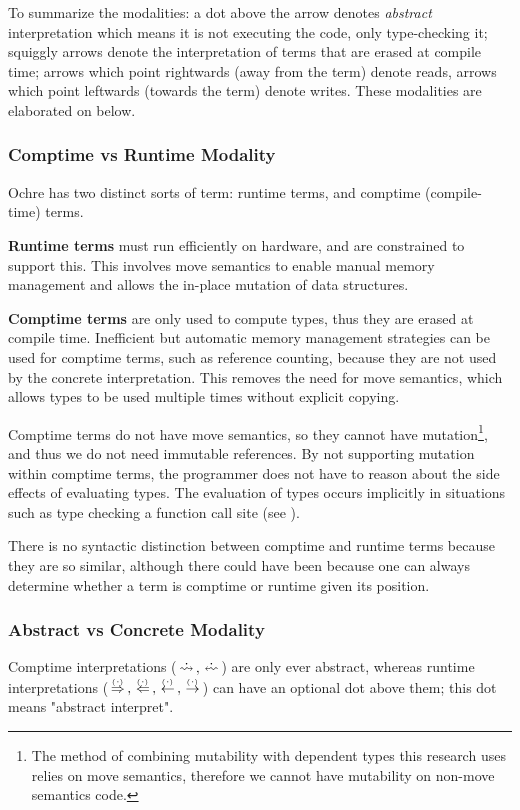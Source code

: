\documentclass[12pt,twoside]{report}
\begin{document}
To summarize the modalities: a dot above the arrow denotes \textit{abstract} interpretation which means it is not executing the code, only type-checking it; squiggly arrows denote the interpretation of terms that are erased at compile time; arrows which point rightwards (away from the term) denote reads, arrows which point leftwards (towards the term) denote writes. These modalities are elaborated on below.

\subsubsection{Comptime vs Runtime Modality}
Ochre has two distinct sorts of term: runtime terms, and comptime (compile-time) terms.

\textbf{Runtime terms} must run efficiently on hardware, and are constrained to support this. This involves move semantics to enable manual memory management and allows the in-place mutation of data structures.

\textbf{Comptime terms} are only used to compute types, thus they are erased at compile time. Inefficient but automatic memory management strategies can be used for comptime terms, such as reference counting, because they are not used by the concrete interpretation. This removes the need for move semantics, which allows types to be used multiple times without explicit copying.

Comptime terms do not have move semantics, so they cannot have mutation\footnote{The method of combining mutability with dependent types this research uses relies on move semantics, therefore we cannot have mutability on non-move semantics code.}, and thus we do not need immutable references. By not supporting mutation within comptime terms, the programmer does not have to reason about the side effects of evaluating types. The evaluation of types occurs implicitly in situations such as type checking a function call site (see ).
 
There is no syntactic distinction between comptime and runtime terms because they are so similar, although there could have been because one can always determine whether a term is comptime or runtime given its position.

\subsubsection{Abstract vs Concrete Modality}
Comptime interpretations ($\erasedreadarrow, \erasedwritearrow$) are only ever abstract, whereas runtime interpretations ($\,\stackrel{_(._)}{\Rightarrow}\,, \,\stackrel{_(._)}{\Leftarrow}\,, \,\stackrel{_(._)}{\leftarrow}\,, \,\stackrel{_(._)}{\rightarrow}\,$) can have an optional dot above them; this dot means "abstract interpret".
\end{document}
